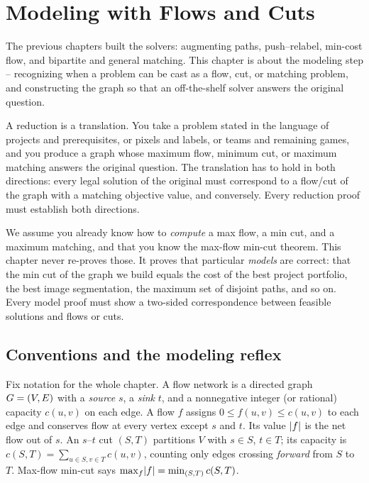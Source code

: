 \chapter{Modeling with Flows and Cuts}

The previous chapters built the solvers: augmenting paths, push--relabel, min-cost flow, and bipartite and general matching. This chapter is about the modeling step -- recognizing when a problem can be cast as a flow, cut, or matching problem, and constructing the graph so that an off-the-shelf solver answers the original question.

A reduction is a translation. You take a problem stated in the language of projects and prerequisites, or pixels and labels, or teams and remaining games, and you produce a graph whose maximum flow, minimum cut, or maximum matching answers the original question. The translation has to hold in both directions: every legal solution of the original must correspond to a flow/cut of the graph with a matching objective value, and conversely. Every reduction proof must establish both directions.

\begin{focusbox}
We assume you already know how to \emph{compute} a max flow, a min cut, and a maximum matching, and that you know the max-flow min-cut theorem. This chapter never re-proves those. It proves that particular \emph{models} are correct: that the min cut of the graph we build equals the cost of the best project portfolio, the best image segmentation, the maximum set of disjoint paths, and so on. Every model proof must show a two-sided correspondence between feasible solutions and flows or cuts.
\end{focusbox}

\section{Conventions and the modeling reflex}
\label{ch18:conventions}

Fix notation for the whole chapter. A flow network is a directed graph $G=(V,E)$ with a \emph{source} $s$, a \emph{sink} $t$, and a nonnegative integer (or rational) capacity $c(u,v)$ on each edge. A flow $f$ assigns $0 \le f(u,v) \le c(u,v)$ to each edge and conserves flow at every vertex except $s$ and $t$. Its value $\lvert f\rvert$ is the net flow out of $s$. An $s$--$t$ cut $(S,T)$ partitions $V$ with $s\in S$, $t\in T$; its capacity is $c(S,T)=\sum_{u\in S, v\in T} c(u,v)$, counting only edges crossing \emph{forward} from $S$ to $T$. Max-flow min-cut says $\max_f \lvert f\rvert = \min_{(S,T)} c(S,T)$.

